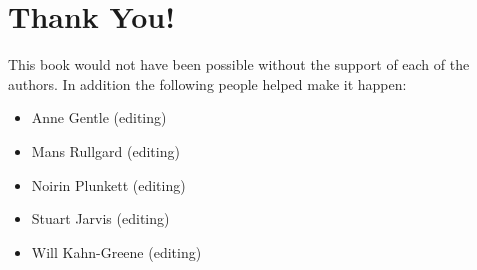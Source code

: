 \section*{Thank You!}

This book would not have been possible without the support of each of the
authors. In addition the following people helped make it happen:
\begin{itemize}
 \item Anne Gentle (editing)
 \item Mans Rullgard (editing)
 \item Noirin Plunkett (editing)
 \item Stuart Jarvis (editing)
 \item Will Kahn-Greene (editing)
\end{itemize}

\newpage